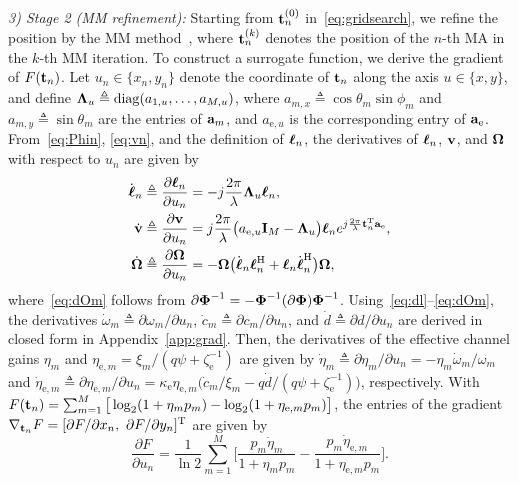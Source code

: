 \documentclass[journal]{IEEEtran}
\begin{document}
\textit{3) Stage 2 (MM refinement):} Starting from $\mathbf{t}_n^{(0)}$ in~\eqref{eq:gridsearch}, we refine the position by the MM method~\cite{Sun2017}, where $\mathbf{t}_n^{(k)}$ denotes the position of the $n$-th MA in the $k$-th MM iteration. To construct a surrogate function, we derive the gradient of $F(\mathbf{t}_n)$. Let $u_n\in\{x_n,y_n\}$ denote the coordinate of $\mathbf{t}_n$ along the axis $u\in\{x,y\}$, and define $\boldsymbol{\Lambda}_u\triangleq\mathrm{diag}(a_{1,u},\ldots,a_{M,u})$, where $a_{m,x}\triangleq\cos\theta_m\sin\phi_m$ and $a_{m,y}\triangleq\sin\theta_m$ are the entries of $\mathbf{a}_m$, and $a_{\mathrm{e},u}$ is the corresponding entry of $\mathbf{a}_{\mathrm e}$. From~\eqref{eq:Phin}, \eqref{eq:vn}, and the definition of $\boldsymbol{\ell}_n$, the derivatives of $\boldsymbol{\ell}_n$, $\mathbf{v}$, and $\boldsymbol{\Omega}$ with respect to $u_n$ are given by
\begin{align}
\dot{\boldsymbol{\ell}}_n&\triangleq\frac{\partial\boldsymbol{\ell}_n}{\partial u_n}=-j\frac{2\pi}{\lambda}\boldsymbol{\Lambda}_u\boldsymbol{\ell}_n,\label{eq:dl}\\
\dot{\mathbf{v}}&\triangleq\frac{\partial\mathbf{v}}{\partial u_n}=j\frac{2\pi}{\lambda}\big(a_{\mathrm{e},u}\mathbf{I}_M-\boldsymbol{\Lambda}_u\big)\boldsymbol{\ell}_ne^{j\frac{2\pi}{\lambda}\mathbf{t}_n^{\mathrm T}\mathbf{a}_{\mathrm e}},\label{eq:dv}\\
\dot{\boldsymbol{\Omega}}&\triangleq\frac{\partial\boldsymbol{\Omega}}{\partial u_n}=-\boldsymbol{\Omega}\big(\dot{\boldsymbol{\ell}}_n\boldsymbol{\ell}_n^{\mathrm H}+\boldsymbol{\ell}_n\dot{\boldsymbol{\ell}}_n^{\mathrm H}\big)\boldsymbol{\Omega},\label{eq:dOm}
\end{align}
where~\eqref{eq:dOm} follows from $\partial\boldsymbol{\Phi}^{-1}=-\boldsymbol{\Phi}^{-1}(\partial\boldsymbol{\Phi})\boldsymbol{\Phi}^{-1}$. Using~\eqref{eq:dl}--\eqref{eq:dOm}, the derivatives $\dot\omega_m\triangleq\partial\omega_m/\partial u_n$, $\dot c_m\triangleq\partial c_m/\partial u_n$, and $\dot d\triangleq\partial d/\partial u_n$ are derived in closed form in Appendix~\ref{app:grad}. Then, the derivatives of the effective channel gains $\eta_m$ and $\eta_{\mathrm{e},m}=\xi_m/(q\psi+\zeta_{\mathrm e}^{-1})$ are given by $\dot\eta_m\triangleq\partial\eta_m/\partial u_n=-\eta_m\dot\omega_m/\omega_m$ and $\dot\eta_{\mathrm{e},m}\triangleq\partial\eta_{\mathrm{e},m}/\partial u_n=\kappa_{\mathrm e}\eta_{\mathrm{e},m}\big(\dot c_m/\xi_m-q\dot d/(q\psi+\zeta_{\mathrm e}^{-1})\big)$, respectively. With $F(\mathbf{t}_n)=\sum_{m=1}^M\big[\log_2(1+\eta_mp_m)-\log_2(1+\eta_{\mathrm{e},m}p_m)\big]$, the entries of the gradient $\nabla_{\mathbf{t}_n}F=[\partial F/\partial x_n,\ \partial F/\partial y_n]^{\mathrm T}$ are given by
\begin{equation}\label{eq:dF}
\frac{\partial F}{\partial u_n}=\frac{1}{\ln2}\sum_{m=1}^{M}\bigg[\frac{p_m\dot\eta_m}{1+\eta_mp_m}-\frac{p_m\dot\eta_{\mathrm{e},m}}{1+\eta_{\mathrm{e},m}p_m}\bigg].
\end{equation}
\end{document}
